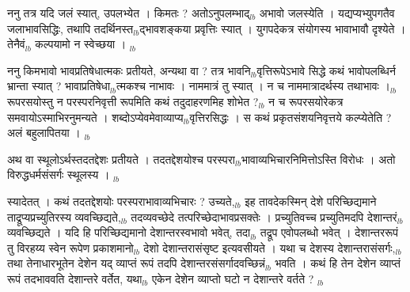 \documentclass[article,12pt,a4paper]{memoir}%
\newcounter{parCount}
\begin{document}
	  \pstart \leavevmode%
	ननु तत्र यदि जलं स्यात्, उपलभ्येत । किमतः ? अतोऽनुपलम्भाद्{\tiny $_{lb}$} अभावो जलस्येति । यद्यप्यभ्युपगतैव जलाभावसिद्धिः, तथापि तदर्थिनस्त{\tiny $_{lb}$}द्भावशङ्कया प्रवृत्तिः स्यात् । युगपदेकत्र संयोगस्य भावाभावौ दृश्येते । तेनैवं{\tiny $_{lb}$} कल्पयामो न स्वेच्छया ।
	{}
	\pend%
      {\tiny $_{lb}$}

	  \pstart \leavevmode%
	ननु किमभावो भावप्रतिषेधात्मकः प्रतीयते, अन्यथा वा ? तत्र भावनि{\tiny $_{lb}$}वृत्तिरूपे\leavevmode{}ऽभावे सिद्धे कथं भावोपलब्धिर्न भ्रान्ता स्यात् ? भावाप्रतिषेधा{\tiny $_{lb}$}त्मकश्च नाभावः । नाममात्रं तु स्यात् । न च नाममात्रादर्थस्य तथाभावः ।{\tiny $_{lb}$} रूपरसयोस्तु न परस्परनिवृत्ती रूपमिति कथं तदुदाहरणमिह शोभेत ?{\tiny $_{lb}$} न च रूपरसयोरेकत्र समवायोऽस्माभिरनुमन्यते । शब्दोऽप्येवमेवाव्याप्य{\tiny $_{lb}$}वृत्तिरसिद्धः । स कथं प्रकृतसंशयनिवृत्तये कल्प्येतेति ? अलं बहुलापितया ।
	{}
	\pend%
      {\tiny $_{lb}$}

	  \pstart \leavevmode%
	अथ वा स्थूलोऽर्थस्तदतद्देशः प्रतीयते । तदतद्देशयोश्च परस्परा{\tiny $_{lb}$}भावाव्यभिचारनिमित्तोऽस्ति विरोधः । अतो विरुद्धधर्मसंसर्गः स्थूलस्य ।
	{}
	\pend%
      {\tiny $_{lb}$}

	  \pstart \leavevmode%
	स्यादेतत् । कथं तदतद्देशयोः परस्पराभावाव्यभिचारः ? उच्यते,{\tiny $_{lb}$} इह तावदेकस्मिन् देशे परिच्छिद्यमाने ताद्रूप्यप्रच्युतिरस्य व्यवच्छिद्यते,{\tiny $_{lb}$} तदव्यवच्छेदे तत्परिच्छेदाभावप्रसक्तेः । प्रच्युतिवच्च प्रच्युतिमदपि देशान्तरं{\tiny $_{lb}$} व्यवच्छिद्यते । यदि हि परिच्छिद्यमानो देशान्तरस्वभावो भवेत्, तदा{\tiny $_{lb}$} तद्रूप एवोपलब्धो भवेत् । देशान्तररूपं तु विरहय्य स्वेन रूपेण प्रकाशमानो{\tiny $_{lb}$} देशो देशान्तरासंसृष्ट इत्यवसीयते । यथा च देशस्य देशान्तरासंसर्गः,{\tiny $_{lb}$} तथा तेनाधारभूतेन देशेन यद् व्याप्तं रूपं तदपि देशान्तरसंसर्गादवच्छिन्नं{\tiny $_{lb}$} भवति । कथं हि तेन देशेन व्याप्तं रूपं तदभाववति देशान्तरे वर्तेत, यथा{\tiny $_{lb}$} एकेन देशेन व्याप्तो घटो न देशान्तरे वर्तते ?
	{}
	\pend%
      {\tiny $_{lb}$}
\end{document}
